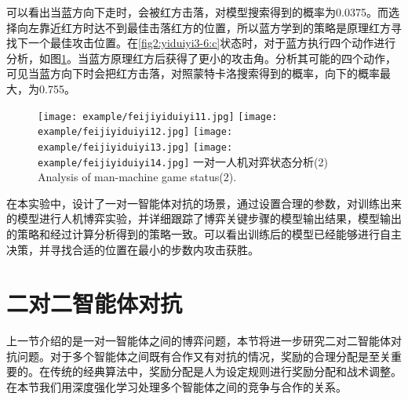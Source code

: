 可以看出当蓝方向下走时，会被红方击落，对模型搜索得到的概率为0.0375。而选择向左靠近红方时达不到最佳击落红方的位置，所以蓝方学到的策略是原理红方寻找下一个最佳攻击位置。在\ref{fig2:yiduiyi3-6:c}状态时，对于蓝方执行四个动作进行分析，如图\ref{fig2:yiduiyi11-14}。当蓝方原理红方后获得了更小的攻击角。分析其可能的四个动作，可见当蓝方向下时会把红方击落，对照蒙特卡洛搜索得到的概率，向下的概率最大，为0.755。

\begin{figure}[htpb]
	\centering
	{\texttt{[image: example/feijiyiduiyi11.jpg]}}
	\hspace{0.5em}
	{\texttt{[image: example/feijiyiduiyi12.jpg]}}
	\newline
	\centering
	{\texttt{[image: example/feijiyiduiyi13.jpg]}}
	\hspace{0.5em}
	{\texttt{[image: example/feijiyiduiyi14.jpg]}}
	\bicaption
	{一对一人机对弈状态分析(2)}
	{Analysis of man-machine game status(2).}
	\label{fig2:yiduiyi11-14}
\end{figure}


在本实验中，设计了一对一智能体对抗的场景，通过设置合理的参数，对训练出来的模型进行人机博弈实验，并详细跟踪了博弈关键步骤的模型输出结果，模型输出的策略和经过计算分析得到的策略一致。可以看出训练后的模型已经能够进行自主决策，并寻找合适的位置在最小的步数内攻击获胜。


\section{二对二智能体对抗}
上一节介绍的是一对一智能体之间的博弈问题，本节将进一步研究二对二智能体对抗问题。对于多个智能体之间既有合作又有对抗的情况，奖励的合理分配是至关重要的。在传统的经典算法中，奖励分配是人为设定规则进行奖励分配和战术调整。在本节我们用深度强化学习处理多个智能体之间的竞争与合作的关系。
